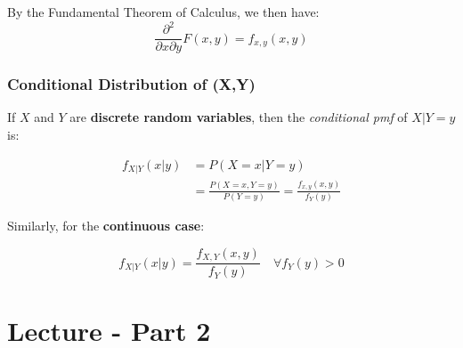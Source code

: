 \documentclass{article}
\begin{document}
By the Fundamental Theorem of Calculus, we then have:
\begin{equation*}
    \frac{\partial^2}{\partial x \partial y} F(x,y) = f_{x,y}(x,y)
\end{equation*}

\subsubsection{Conditional Distribution of (X,Y)}

If $X$ and $Y$ are \textbf{discrete random variables}, then the \textit{conditional pmf} of $X|Y = y$ is:

\begin{equation*}
    \begin{split}
        f_{X|Y}(x|y) &= P(X=x|Y=y)\\
            &= \frac{P(X=x,Y=y)}{P(Y=y)} = \frac{f_{x,y}(x,y)}{f_Y(y)}
    \end{split}
\end{equation*}

Similarly, for the \textbf{continuous case}:

\begin{equation*}
    f_{X|Y}(x|y) = \frac{f_{X,Y}(x,y)}{f_Y(y)} \quad \forall f_Y(y) > 0
\end{equation*}

\section{Lecture - Part 2}
\end{document}
